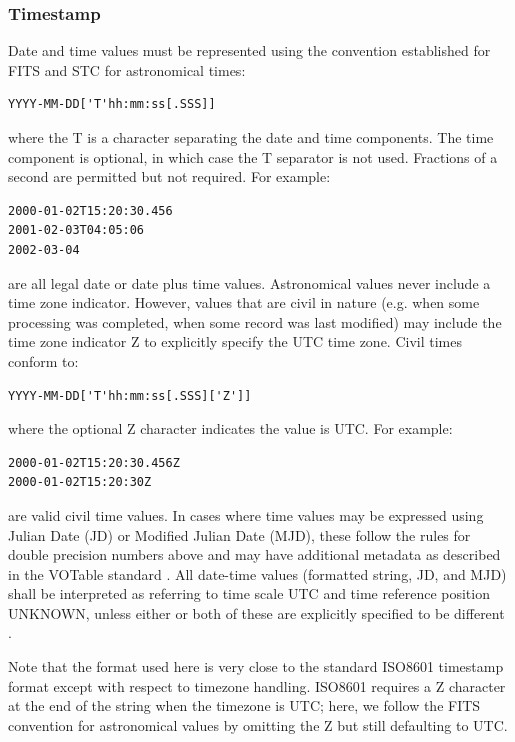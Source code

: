 \documentclass[11pt,letter]{ivoa}
\begin{document}
\subsubsection{Timestamp}
Date and time values must be represented  using the convention established for 
FITS \citep{std:FITS} and STC \citep{2007ivoa.spec.1030R} for astronomical times:

\begin{verbatim}
YYYY-MM-DD['T'hh:mm:ss[.SSS]]
\end{verbatim}

where the  T is a character separating the date and time components. The time 
component is optional, in which case the T separator is not used. Fractions of a 
second are permitted but not required. For example:

\begin{verbatim}
2000-01-02T15:20:30.456
2001-02-03T04:05:06
2002-03-04
\end{verbatim}

are all legal date or date plus time values. Astronomical values never 
include a time zone indicator. However, values that 
are civil in nature (e.g. when some processing was completed, when some record 
was last modified) may include the time zone indicator Z to explicitly specify 
the UTC time zone. Civil times conform to:

\begin{verbatim}
YYYY-MM-DD['T'hh:mm:ss[.SSS]['Z']]
\end{verbatim}

where the optional Z character indicates the value is UTC. For example:

\begin{verbatim}
2000-01-02T15:20:30.456Z
2000-01-02T15:20:30Z
\end{verbatim}

are valid civil time values. In cases where time values may be 
expressed using Julian Date (JD) or Modified Julian Date (MJD), these follow the 
rules for double precision numbers above and may have additional metadata as 
described in the VOTable standard \citep{2019ivoa.spec.1021O}. All date-time values (formatted string, JD, 
and MJD) shall be interpreted as referring to time scale UTC and time reference 
position UNKNOWN, unless either or both of these are explicitly specified to be 
different \citep{2007ivoa.spec.1030R}. 

Note that the format used here is very close to the standard ISO8601 timestamp 
format except with respect to timezone handling. ISO8601 requires a Z character 
at the end of the string when the timezone is UTC; here, we follow the FITS 
\citep{std:FITS} convention for astronomical values by omitting the Z but still 
defaulting to UTC.
\end{document}
